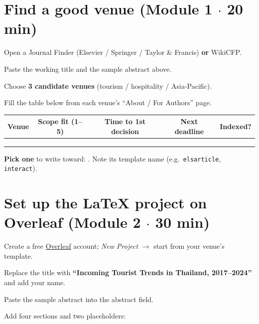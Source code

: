 \documentclass[11pt]{article}
\begin{document}
\section{Find a good venue \hfill {\normalfont\small (Module 1 $\cdot$ 20 min)}}

\begin{checklist}
\item Open a Journal Finder (Elsevier / Springer / Taylor \& Francis) \textbf{or} WikiCFP.
\item Paste the working title and the sample abstract above.
\item Choose \textbf{3 candidate venues} (tourism / hospitality / Asia-Pacific).
\item Fill the table below from each venue's ``About / For Authors'' page.
\end{checklist}

\begin{center}\small
\begin{tabular}{@{}p{4.2cm}cccc@{}}
\toprule
\textbf{Venue} & \textbf{Scope fit (1--5)} & \textbf{Time to 1st decision} & \textbf{Next deadline} & \textbf{Indexed?} \\
\midrule
\rule{0pt}{2.4ex}\dotfill & & & & \\
\rule{0pt}{2.4ex}\dotfill & & & & \\
\rule{0pt}{2.4ex}\dotfill & & & & \\
\bottomrule
\end{tabular}
\end{center}

\textbf{Pick one} to write toward: \underline{\hspace{7cm}}. Note its template name (e.g.\ \texttt{elsarticle}, \texttt{interact}).

\section{Set up the LaTeX project on Overleaf \hfill {\normalfont\small (Module 2 $\cdot$ 30 min)}}

\begin{checklist}
\item Create a free \href{https://www.overleaf.com}{Overleaf} account; \emph{New Project} $\rightarrow$ start from your venue's template.
\item Replace the title with \textbf{``Incoming Tourist Trends in Thailand, 2017--2024''} and add your name.
\item Paste the sample abstract into the abstract field.
\item Add four sections and two placeholders:
\end{checklist}
\end{document}

